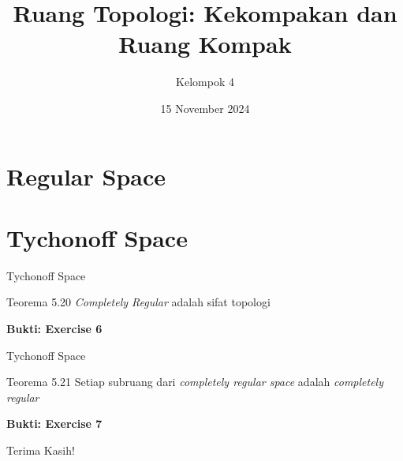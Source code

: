 \documentclass{beamer}
\title{Ruang Topologi: Kekompakan dan Ruang Kompak}
\author{Kelompok 4}
\date{15 November 2024}
\begin{document}
\begin{frame}
  \titlepage
\end{frame}


\section{Regular Space}

\section{Tychonoff Space}





\begin{frame}{Tychonoff Space}
    \begin{block}{Teorema 5.20}
        \textit{Completely Regular} adalah sifat topologi
    \end{block}

    \textbf{Bukti: Exercise 6} %
\end{frame}

\begin{frame}{Tychonoff Space}
    \begin{block}{Teorema 5.21}
        Setiap subruang dari \textit{completely regular space} adalah \textit{completely regular}
    \end{block}

    \textbf{Bukti: Exercise 7}  %
\end{frame}


\begin{frame}
  \centering
  \Huge Terima Kasih!
\end{frame}
\end{document}
